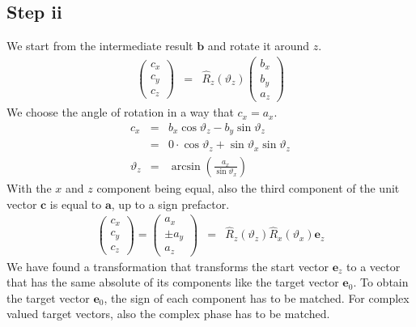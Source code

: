 \documentclass[12pt,a4paper,twoside,openright,BCOR10mm,headsepline,titlepage,abstracton,chapterprefix,final]{scrreprt}
\newcommand\Vector[1]{{\mathbf{#1}}}
\begin{document}
\subsection{Step ii}
We start from the intermediate result $\Vector{b}$ and rotate it around $z$.
\begin{eqnarray}
  \begin{pmatrix}
  c_x \\ c_y \\ c_z
 \end{pmatrix}
 &=&
 \hat{R}_z(\vartheta_z) 
 \begin{pmatrix}
  b_x \\ b_y \\ a_z
 \end{pmatrix}
\end{eqnarray}
We choose the angle of rotation in a way that $c_x = a_x$.
\begin{eqnarray}
 c_x &=& b_x \cos \vartheta_z - b_y \sin \vartheta_z \\
     &=& 0 \cdot \cos \vartheta_z + \sin \vartheta_x \sin \vartheta_z \\
 \vartheta_z &=& \arcsin\left(\frac{a_x}{\sin \vartheta_x}\right)
\end{eqnarray}
With the $x$ and $z$ component being equal, also the third component of the unit vector $\Vector{c}$ is equal to $\Vector{a}$,
up to a sign prefactor.
\begin{eqnarray}
 \begin{pmatrix}
  c_x \\ c_y \\ c_z
 \end{pmatrix}
 =
 \begin{pmatrix}
  a_x \\ \pm a_y \\ a_z
 \end{pmatrix}
 &=& \hat{R}_z(\vartheta_z) \hat{R}_x(\vartheta_x) \Vector{e}_z
\end{eqnarray}
We have found a transformation that transforms the start vector $\Vector{e}_z$ to a vector 
that has the same absolute of its components like the target vector $\Vector{e}_0$.
To obtain the target vector $\Vector{e}_0$, the sign of each component has to be matched.
For complex valued target vectors, also the complex phase has to be matched.
\end{document}
